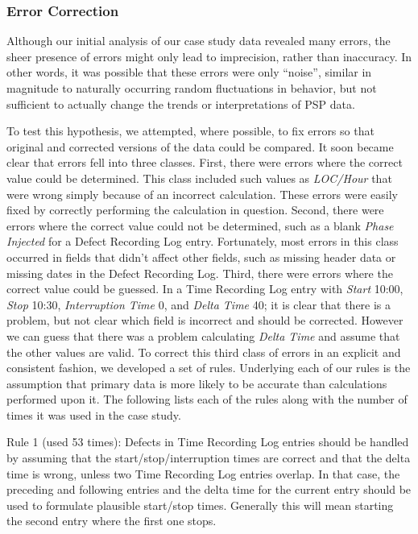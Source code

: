   \subsubsection{Error Correction}
  \label{sec:rules}

  Although our initial analysis of our case study data revealed many
  errors, the sheer presence of errors might only lead to imprecision,
  rather than inaccuracy. In other words, it was possible that these errors
  were only ``noise'', similar in magnitude to naturally occurring random
  fluctuations in behavior, but not sufficient to actually change the
  trends or interpretations of PSP data.
 
  To test this hypothesis, we attempted, where possible, to fix errors so
  that original and corrected versions of the data could be compared.  It
  soon became clear that errors fell into three classes.  First, there were
  errors where the correct value could be determined.  This class included
  such values as {\it LOC/Hour} that were wrong simply because of an
  incorrect calculation. These errors were easily fixed by correctly
  performing the calculation in question.  Second, there were errors where
  the correct value could not be determined, such as a blank {\it Phase
    Injected} for a Defect Recording Log entry.  Fortunately, most errors
  in this class occurred in fields that didn't affect other fields, such as
  missing header data or missing dates in the Defect Recording Log.  Third,
  there were errors where the correct value could be guessed.  In a Time
  Recording Log entry with {\it Start} 10:00, {\it Stop} 10:30, {\it
    Interruption Time} 0, and {\it Delta Time} 40; it is clear that there
  is a problem, but not clear which field is incorrect and should be
  corrected.  However we can guess that there was a problem calculating
  {\it Delta Time} and assume that the other values are valid.  To correct
  this third class of errors in an explicit and consistent fashion, we
  developed a set of rules.  Underlying each of our rules is the assumption
  that primary data is more likely to be accurate than calculations
  performed upon it. The following lists each of the rules along with
  the number of times it was used in the case study.
      
  Rule 1 (used 53 times): Defects in Time Recording Log entries should be
  handled by assuming that the start/stop/interruption times are correct
  and that the delta time is wrong, unless two Time Recording Log entries
  overlap.  In that case, the preceding and following entries and the delta
  time for the current entry should be used to formulate plausible
  start/stop times.  Generally this will mean starting the second entry
  where the first one stops.

